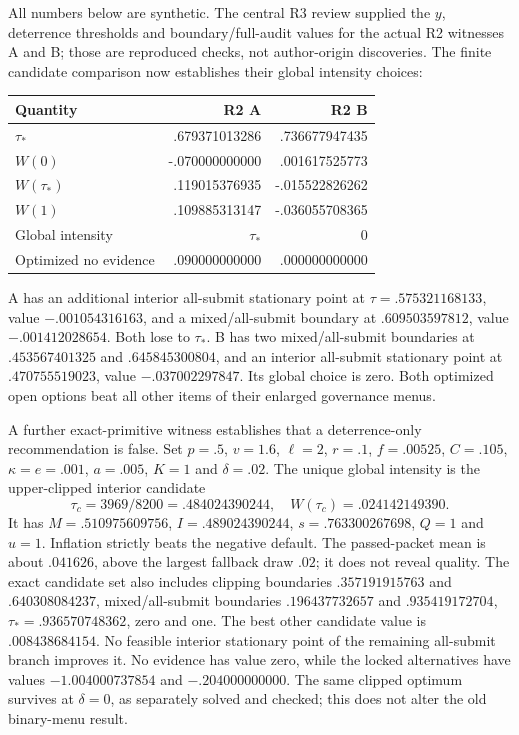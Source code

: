 \documentclass[11pt]{article}
\begin{document}
All numbers below are synthetic. The central R3 review supplied the $y$, deterrence thresholds and boundary/full-audit values for the actual R2 witnesses A and B; those are reproduced checks, not author-origin discoveries. The finite candidate comparison now establishes their global intensity choices:
\begin{center}\small
\begin{tabular}{lrr}\toprule
Quantity & R2 A & R2 B\\\midrule
$\tau_*$ & .679371013286 & .736677947435\\
$W(0)$ & -.070000000000 & .001617525773\\
$W(\tau_*)$ & .119015376935 & -.015522826262\\
$W(1)$ & .109885313147 & -.036055708365\\
Global intensity & $\tau_*$ & $0$\\
Optimized no evidence & .090000000000 & .000000000000\\\bottomrule
\end{tabular}\end{center}
A has an additional interior all-submit stationary point at $\tau=.575321168133$, value $-.001054316163$, and a mixed/all-submit boundary at $.609503597812$, value $-.001412028654$. Both lose to $\tau_*$. B has two mixed/all-submit boundaries at $.453567401325$ and $.645845300804$, and an interior all-submit stationary point at $.470755519023$, value $-.037002297847$. Its global choice is zero. Both optimized open options beat all other items of their enlarged governance menus.

A further exact-primitive witness establishes that a deterrence-only recommendation is false. Set $p=.5$, $v=1.6$, $\ell=2$, $r=.1$, $f=.00525$, $C=.105$, $\kappa=e=.001$, $a=.005$, $K=1$ and $\delta=.02$. The unique global intensity is the upper-clipped interior candidate
\begin{equation}\tau_c=3969/8200=.484024390244,\quad W(\tau_c)=.024142149390.\label{eq:interiorwitness}\end{equation}
It has $M=.510975609756$, $I=.489024390244$, $s=.763300267698$, $Q=1$ and $u=1$. Inflation strictly beats the negative default. The passed-packet mean is about $.041626$, above the largest fallback draw $.02$; it does not reveal quality. The exact candidate set also includes clipping boundaries $.357191915763$ and $.640308084237$, mixed/all-submit boundaries $.196437732657$ and $.935419172704$, $\tau_*=.936570748362$, zero and one. The best other candidate value is $.008438684154$. No feasible interior stationary point of the remaining all-submit branch improves it. No evidence has value zero, while the locked alternatives have values $-1.004000737854$ and $-.204000000000$. The same clipped optimum survives at $\delta=0$, as separately solved and checked; this does not alter the old binary-menu result.
\end{document}
